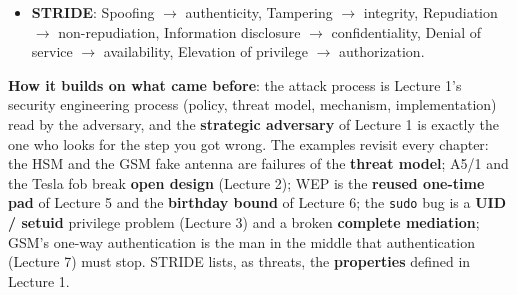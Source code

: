 \begin{recapbox}[title={Exam-ready recap --- Lecture 8: Adversarial thinking I}]
\begin{itemize}
        \textbf{security cards}.
  \item \textbf{STRIDE}: Spoofing $\to$ authenticity, Tampering $\to$ integrity, Repudiation
        $\to$ non-repudiation, Information disclosure $\to$ confidentiality, Denial of service
        $\to$ availability, Elevation of privilege $\to$ authorization.
\end{itemize}
\textbf{How it builds on what came before}: the attack process is Lecture 1's security engineering
process (policy, threat model, mechanism, implementation) read by the adversary, and the
\textbf{strategic adversary} of Lecture 1 is exactly the one who looks for the step you got wrong.
The examples revisit every chapter: the HSM and the GSM fake antenna are failures of the
\textbf{threat model}; A5/1 and the Tesla fob break \textbf{open design} (Lecture 2); WEP is the
\textbf{reused one-time pad} of Lecture 5 and the \textbf{birthday bound} of Lecture 6; the
\texttt{sudo} bug is a \textbf{UID / setuid} privilege problem (Lecture 3) and a broken
\textbf{complete mediation}; GSM's one-way authentication is the man in the middle that
authentication (Lecture 7) must stop. STRIDE lists, as threats, the \textbf{properties} defined in
Lecture 1.
\end{recapbox}
